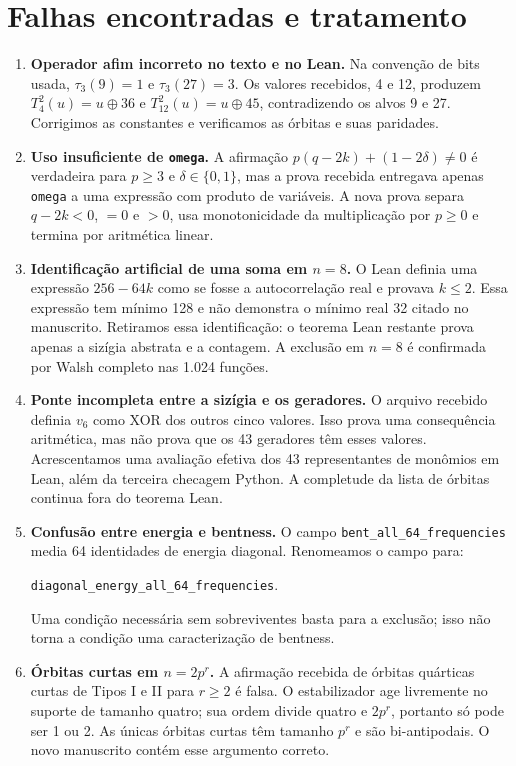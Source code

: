 \documentclass[11pt,a4paper]{article}
\begin{document}
\section{Falhas encontradas e tratamento}
\begin{enumerate}
\item \textbf{Operador afim incorreto no texto e no Lean.}
Na convenção de bits usada, $\tau_3(9)=1$ e $\tau_3(27)=3$.
Os valores recebidos, 4 e 12, produzem
$T_4^2(u)=u\mathbin{\oplus}36$ e
$T_{12}^2(u)=u\mathbin{\oplus}45$, contradizendo os alvos 9 e 27.
Corrigimos as constantes e verificamos as órbitas e suas paridades.

\item \textbf{Uso insuficiente de \texttt{omega}.}
A afirmação $p(q-2k)+(1-2\delta)\ne0$ é verdadeira para
$p\ge3$ e $\delta\in\{0,1\}$, mas a prova recebida entregava apenas
\texttt{omega} a uma expressão com produto de variáveis. A nova prova
separa $q-2k<0$, $=0$ e $>0$, usa monotonicidade da multiplicação
por $p\ge0$ e termina por aritmética linear.

\item \textbf{Identificação artificial de uma soma em $n=8$.}
O Lean definia uma expressão $256-64k$ como se fosse a autocorrelação
real e provava $k\le2$. Essa expressão tem mínimo 128 e não demonstra
o mínimo real 32 citado no manuscrito. Retiramos essa identificação:
o teorema Lean restante prova apenas a sizígia abstrata e a contagem.
A exclusão em $n=8$ é confirmada por Walsh completo nas 1.024 funções.

\item \textbf{Ponte incompleta entre a sizígia e os geradores.}
O arquivo recebido definia $v_6$ como XOR dos outros cinco valores.
Isso prova uma consequência aritmética, mas não prova que os 43
geradores têm esses valores. Acrescentamos uma avaliação efetiva dos
43 representantes de monômios em Lean, além da terceira checagem Python.
A completude da lista de órbitas continua fora do teorema Lean.

\item \textbf{Confusão entre energia e bentness.}
O campo \texttt{bent\_all\_64\_frequencies} media 64 identidades
de energia diagonal. Renomeamos o campo para:\par
\noindent\texttt{diagonal\_energy\_all\_64\_frequencies}.\par
Uma condição necessária sem sobreviventes basta para a exclusão;
isso não torna a condição uma caracterização de bentness.

\item \textbf{Órbitas curtas em $n=2p^r$.}
A afirmação recebida de órbitas quárticas curtas de Tipos I e II para
$r\ge2$ é falsa. O estabilizador age livremente no suporte de tamanho
quatro; sua ordem divide quatro e $2p^r$, portanto só pode ser 1 ou 2.
As únicas órbitas curtas têm tamanho $p^r$ e são bi-antipodais.
O novo manuscrito contém esse argumento correto.


\end{enumerate}
\end{document}
